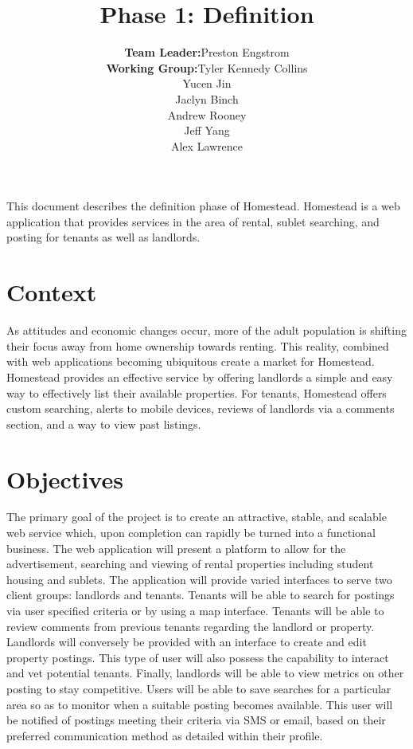 \documentclass[14pt]{article}
\title{Phase 1: Definition}
\author{ \begin{tabular}{rl}
		\textbf{Team Leader:} & Preston Engstrom \\
		\textbf{Working Group:} & Tyler Kennedy Collins\\ & Yucen Jin \\ & Jaclyn Binch  \\ & Andrew Rooney \\ & Jeff Yang \\ & Alex Lawrence
	\end{tabular}}
\date{}
\begin{document}
\maketitle

\thispagestyle{fancy}

\abstract
This document describes the definition phase of Homestead. Homestead is a web application that provides services in the area of rental, sublet searching, and posting for tenants as well as landlords.

\section{Context}
As attitudes and economic changes occur, more of the adult population is shifting their focus away from home ownership towards renting. This reality, combined with web applications becoming ubiquitous create a market for Homestead. \\Homestead provides an effective service by offering landlords a simple and easy way to effectively list their available properties. For tenants, Homestead offers custom searching, alerts to mobile devices, reviews of landlords via a comments section, and a way to view past listings.

\section{Objectives}
The primary goal of the project is to create an attractive, stable, and scalable web service which, upon completion can rapidly be turned into a functional business. The web application will present a platform to allow for the advertisement, searching and viewing of rental properties including student housing and sublets. The application will provide varied interfaces to serve two client groups: landlords and tenants. Tenants will be able to search for postings via user specified criteria or by using a map interface. Tenants will be able to review comments from previous tenants regarding the landlord or property. Landlords will conversely be provided with an interface to create and edit property postings. This type of user will also possess the capability to interact and vet potential tenants. Finally, landlords will be able to view metrics on other posting to stay competitive. Users will be able to save searches for a particular area so as to monitor when a suitable posting becomes available. This user will be notified of postings meeting their criteria via SMS or email, based on their preferred communication method as detailed within their profile.
\end{document}
